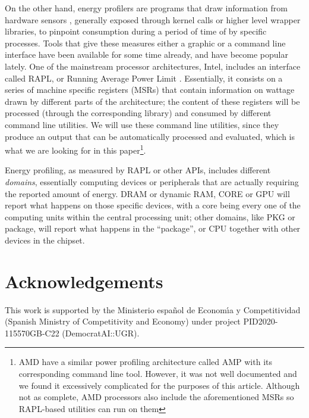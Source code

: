 \documentclass[a4paper,twoside]{article}
\begin{document}
On the other hand, energy profilers are programs that draw information from
hardware sensors \cite{sinha2001jouletrack}, generally exposed through kernel
calls or higher level wrapper libraries, to pinpoint consumption during a period
of time of by specific processes. Tools that give these measures either a
graphic  or a command line interface have been available for some time already,
and have become popular lately. One of the mainstream processor architectures,
Intel, includes an interface called RAPL, or Running Average Power
Limit \cite{rapl}. Essentially, it consists on a series of machine specific registers (MSRs)
that contain information on wattage drawn by different parts of the
architecture; the content of these registers will be processed (through the
corresponding library) and consumed by different command line utilities. We will
use these command line utilities, since they produce an output that can be
automatically processed and evaluated, which is what we are looking for in this
paper\footnote{AMD have a similar power profiling architecture called AMP with
  its corresponding command line tool. However, it was not well documented and
  we found it excessively complicated for the purposes of this article. Although
  not as complete, AMD processors also include the aforementioned MSRs so
  RAPL-based utilities can run on them}.

Energy profiling, as measured by RAPL or other APIs, includes different
\emph{domains}, essentially computing devices or peripherals that are actually
requiring the reported amount of energy. DRAM or dynamic RAM, CORE or GPU will
report what happens on those specific devices, with a core being every one of
the computing units within the central processing unit; other domains, like PKG or
package, will report what happens in the ``package'', or CPU together with other
devices in the chipset. 

\section*{Acknowledgements}

This work is supported by the Ministerio espa\~{n}ol de Econom\'{\i}a y
Competitividad (Spanish Ministry of Competitivity and Economy) under project
PID2020-115570GB-C22 (DemocratAI::UGR).



{\small
}
\end{document}
